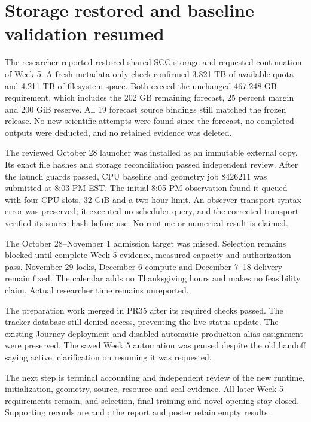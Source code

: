 \section{Storage restored and baseline validation resumed}

The researcher reported restored shared SCC storage and requested continuation
of Week 5. A fresh metadata-only check confirmed 3.821 TB of available quota
and 4.211 TB of filesystem space. Both exceed the unchanged 467.248 GB
requirement, which includes the 202 GB remaining forecast, 25 percent margin
and 200 GiB reserve. All 19 forecast source bindings still matched the frozen
release. No new scientific attempts were found since the forecast, no completed
outputs were deducted, and no retained evidence was deleted.

The reviewed October 28 launcher was installed as an immutable external copy.
Its exact file hashes and storage reconciliation passed independent review.
After the launch guards passed, CPU baseline and geometry job 8426211 was
submitted at 8:03 PM EST. The initial 8:05 PM observation found it queued with
four CPU slots, 32 GiB and a two-hour limit. An observer transport syntax error
was preserved; it executed no scheduler query, and the corrected transport
verified its source hash before use. No runtime or numerical result is claimed.

The October 28--November 1 admission target was missed. Selection remains
blocked until complete Week 5 evidence, measured capacity and authorization
pass. November 29 locks, December 6 compute and December 7--18 delivery remain
fixed. The calendar adds no Thanksgiving hours and makes no feasibility claim.
Actual researcher time remains unreported.

The preparation work merged in PR35 after its required checks passed. The
tracker database still denied access, preventing the live status update.
The existing Journey deployment and disabled automatic production alias
assignment were preserved. The saved Week 5 automation was paused despite the
old handoff saying active; clarification on resuming it was requested.

The next step is terminal accounting and independent review of the new runtime,
initialization, geometry, source, resource and seal evidence. All later Week 5
requirements remain, and selection, final training and novel opening stay
closed. Supporting records are  and
; the report and poster retain empty results.
